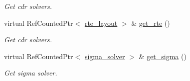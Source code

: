 \begin{DoxyCompactItemize}
\begin{DoxyCompactList}\small\item\em Get cdr solvers. \end{DoxyCompactList}\item 
virtual Ref\+Counted\+Ptr$<$ \hyperlink{classrte__layout}{rte\+\_\+layout} $>$ \& \hyperlink{classtime__stepper_a65c0d74efbd14a275e8443cf37e637b4}{get\+\_\+rte} ()
\begin{DoxyCompactList}\small\item\em Get cdr solvers. \end{DoxyCompactList}\item 
virtual Ref\+Counted\+Ptr$<$ \hyperlink{classsigma__solver}{sigma\+\_\+solver} $>$ \& \hyperlink{classtime__stepper_a7028973370d71e725efdc459f786fa54}{get\+\_\+sigma} ()
\begin{DoxyCompactList}\small\item\em Get sigma solver. \end{DoxyCompactList}\end{DoxyCompactItemize}
